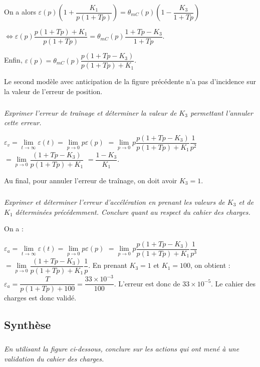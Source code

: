 \documentclass[10pt,fleqn]{article} %
\begin{document}
\begin{multicols}{2}
\begin{corrige}
On a alors 
$
\varepsilon(p)  \left(1+ \dfrac{K_1 }{p \left( 1+Tp\right)} \right)
=  \theta_{mC}(p)\left(1-  \dfrac{K_3}{ 1+Tp}\right)$

$\Leftrightarrow
\varepsilon(p)  \dfrac{p \left( 1+Tp\right)+K_1 }{p \left( 1+Tp\right)} 
=  \theta_{mC}(p)  \dfrac{ 1+Tp-K_3  }{ 1+Tp}
$.

Enfin,  
$\varepsilon(p) = \theta_{mC}(p)\dfrac{p\left( 1+Tp-K_3\right) }{p \left( 1+Tp\right)+K_1}
$.
\end{corrige}

\else
\fi

Le second modèle avec anticipation de la figure précédente n’a pas d’incidence sur la valeur de l’erreur de position.

\subparagraph{}\textit{Exprimer l’erreur de traînage et déterminer la valeur de $K_3$ permettant l’annuler cette erreur.}

\ifprof

\begin{corrige}
$\varepsilon_v = \lim\limits_{t\to \infty} \varepsilon(t)= \lim\limits_{p\to 0} p\varepsilon(p) $ 
$= \lim\limits_{p\to 0} p \dfrac{p\left( 1+Tp-K_3\right) }{p \left( 1+Tp\right)+K_1} \dfrac {1}{p^2}$
$= \lim\limits_{p\to 0}  \dfrac{\left( 1+Tp-K_3\right) }{p \left( 1+Tp\right)+K_1}$
$=\dfrac{1-K_3}{K_1}$.


Au final, pour annuler l'erreur de traînage, on doit avoir $K_3=1$.
\end{corrige}
\else
\fi
\subparagraph{}\textit{Exprimer et déterminer l’erreur d’accélération en prenant les valeurs de $K_3$ et de $K_1$ déterminées
précédemment. Conclure quant au respect du cahier des charges.}

\ifprof

On a : 

\begin{corrige}
$\varepsilon_a = \lim\limits_{t\to \infty} \varepsilon(t)= \lim\limits_{p\to 0} p\varepsilon(p) $ 
$= \lim\limits_{p\to 0} p \dfrac{p\left( 1+Tp-K_3\right) }{p \left( 1+Tp\right)+K_1} \dfrac {1}{p^3}$
$= \lim\limits_{p\to 0} \dfrac{\left( 1+Tp-K_3\right) }{p \left( 1+Tp\right)+K_1} \dfrac {1}{p}$. En prenant $K_3=1$ et $K_1=100$, on obtient :
$\varepsilon_a = \dfrac{ T}{p \left( 1+Tp\right)+100}=\dfrac{33\times 10^{-3}}{100} $.
L'erreur est donc de $33\times 10^{-5}$. Le cahier des charges est donc validé. 

\end{corrige}
\else
\fi

\subsection*{Synthèse}
\subparagraph{}
\textit{En utilisant la figure ci-dessous, conclure sur les actions qui ont mené à une validation du cahier des charges.}


\end{multicols}
\end{document}
